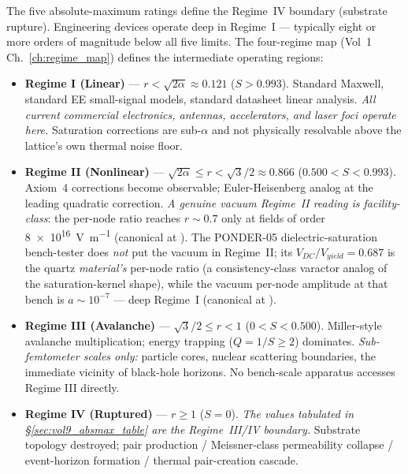 The five absolute-maximum ratings define the Regime~IV boundary (substrate rupture). Engineering devices operate deep in Regime~I --- typically eight or more orders of magnitude below all five limits. The four-regime map (Vol~1 Ch.~\ref{ch:regime_map}) defines the intermediate operating regions:

\begin{itemize}
    \item \textbf{Regime I (Linear)} --- $r < \sqrt{2\alpha} \approx 0.121$ ($S > 0.993$). Standard Maxwell, standard EE small-signal models, standard datasheet linear analysis. \emph{All current commercial electronics, antennas, accelerators, and laser foci operate here.} Saturation corrections are sub-$\alpha$ and not physically resolvable above the lattice's own thermal noise floor.
    \item \textbf{Regime II (Nonlinear)} --- $\sqrt{2\alpha} \leq r < \sqrt{3}/2 \approx 0.866$ ($0.500 < S < 0.993$). Axiom~4 corrections become observable; Euler-Heisenberg analog at the leading quadratic correction. \emph{A genuine vacuum Regime~II reading is facility-class}: the per-node ratio reaches $r \sim 0.7$ only at fields of order \qty{8e16}{\volt\per\metre} (canonical at ). The PONDER-05 dielectric-saturation bench-tester does \emph{not} put the vacuum in Regime~II; its $V_{DC}/V_{yield} = 0.687$ is the quartz \emph{material's} per-node ratio (a consistency-class varactor analog of the saturation-kernel shape), while the vacuum per-node amplitude at that bench is $a \sim 10^{-7}$ --- deep Regime~I (canonical at ).
    \item \textbf{Regime III (Avalanche)} --- $\sqrt{3}/2 \leq r < 1$ ($0 < S < 0.500$). Miller-style avalanche multiplication; energy trapping ($Q = 1/S \geq 2$) dominates. \emph{Sub-femtometer scales only:} particle cores, nuclear scattering boundaries, the immediate vicinity of black-hole horizons. No bench-scale apparatus accesses Regime III directly.
    \item \textbf{Regime IV (Ruptured)} --- $r \geq 1$ ($S = 0$). \emph{The values tabulated in \S\ref{sec:vol9_absmax_table} are the Regime~III/IV boundary.} Substrate topology destroyed; pair production / Meissner-class permeability collapse / event-horizon formation / thermal pair-creation cascade.
\end{itemize}

